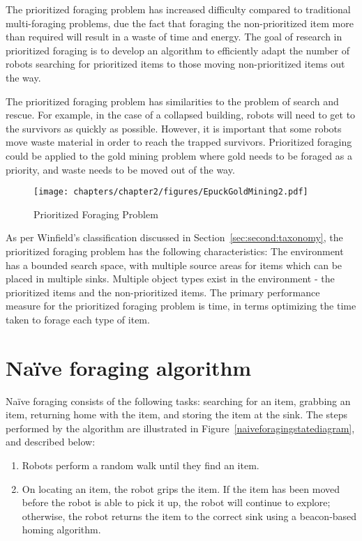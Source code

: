 The prioritized foraging problem has increased difficulty compared to traditional multi-foraging problems, due the fact that foraging the non-prioritized item more than required will result in a waste of time and energy. The goal of research in prioritized foraging is to develop an algorithm to efficiently adapt the number of robots searching for prioritized items to those moving non-prioritized items out the way. 

The prioritized foraging problem has similarities to the problem of search and rescue. For example, in the case of a collapsed building, robots will need to get to the survivors as quickly as possible. However, it is important that some robots move waste material in order to reach the trapped survivors. Prioritized foraging could be applied to the gold mining problem where gold needs to be foraged as a priority, and waste needs to be moved out of the way.


\begin{figure} [h]
	\centering
	\texttt{[image: chapters/chapter2/figures/EpuckGoldMining2.pdf]}
	\caption{Prioritized Foraging Problem }
	\label{prioritizedforaging}
\end{figure}

As per Winfield's classification discussed in Section~\ref{sec:second:taxonomy}, the prioritized foraging problem has the following characteristics: The environment has a bounded search space, with multiple source areas for items which can be placed in multiple sinks. Multiple object types exist in the environment - the prioritized items and the non-prioritized items. The primary  performance measure for the prioritized foraging problem is time, in terms optimizing the time taken to forage each type of item. 


\section{Na\"ive foraging algorithm}
\label{naiveforaging}

Na\"ive foraging consists of the following tasks: searching for an item, grabbing an item, returning home with the item, and storing the item at the sink. The steps performed by the algorithm are illustrated in Figure~\ref{naiveforagingstatediagram}, and described below:  

\begin{enumerate}
	\item Robots perform a random walk until they find an item.
	\item On locating an item, the robot grips the item. If the item has been moved before the robot is able to pick it up, the robot will continue to explore; otherwise, the robot returns the item to the correct sink using a beacon-based homing algorithm.
\end{enumerate}

